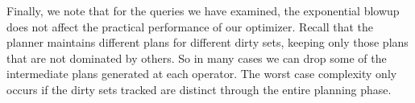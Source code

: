 Finally, we note that for the queries we have examined, the exponential blowup does not affect the practical performance of our optimizer.
Recall that the planner maintains different plans for different dirty sets, keeping only those plans that are not dominated by others.
So in many cases we can drop some of the intermediate plans generated at each operator.
The worst case complexity only occurs if the dirty sets tracked are distinct through the entire planning phase.


